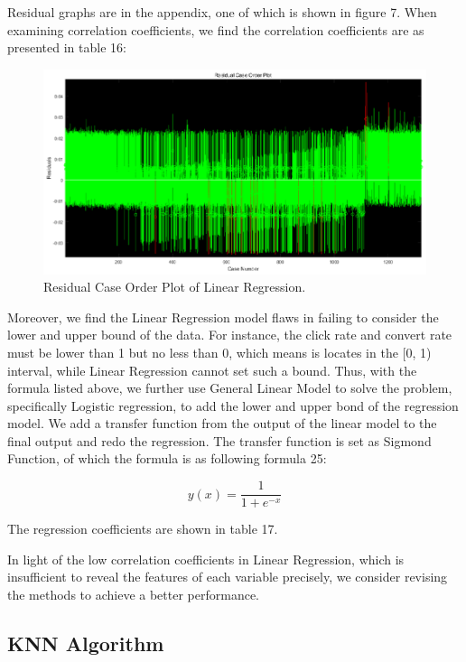Residual graphs are in the appendix, one of which is shown in figure 7. When examining correlation coefficients, we find the correlation coefficients are as presented in table 16: 

\begin{figure}[!ht]
	\centering
	\includegraphics[width=360pt]{fig7.eps}
	\caption{Residual Case Order Plot of Linear Regression.}
	\label{fig7}
\end{figure}
Moreover, we find the Linear Regression model flaws in failing to consider the lower and upper bound of the data. For instance, the click rate and convert rate must be lower than 1 but no less than 0, which means is locates in the [0, 1) interval, while Linear Regression cannot set such a bound. Thus, with the formula listed above, we further use General Linear Model to solve the problem, specifically Logistic regression, to add the lower and upper bond of the regression model. We add a transfer function from the output of the linear model to the final output and redo the regression. The transfer function is set as Sigmond Function, of which the formula is as following formula 25: 

\begin{equation}
y ( x ) = \frac { 1 } { 1 + e ^ { - x } }
\end{equation}

The regression coefficients are shown in table 17. 

In light of the low correlation coefficients in Linear Regression, which is insufficient to reveal the features of each variable precisely, we consider revising the methods to achieve a better performance. 

\subsection{KNN Algorithm}

